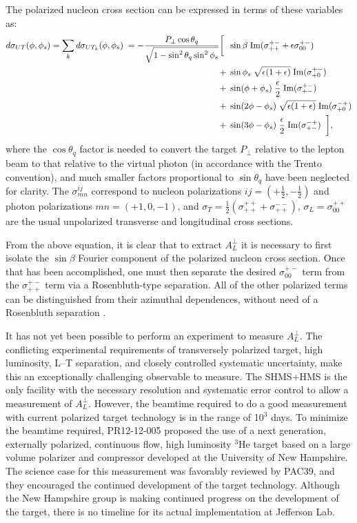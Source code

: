The polarized nucleon cross section can be expressed \cite{Di05,hermes-thesis} 
in terms of these variables as:
\begin{equation}
\begin{split}\label{eqn:sigtarg}
d\sigma_{UT}(\phi,\phi_s) =  \sum_k d\sigma_{UT_k}(\phi,\phi_s) \;
= -\frac{P_\perp \cos\theta_q}{\sqrt{1-\sin^2\theta_q \sin^2\phi_s}} \biggl[\; 
  &\; \sin\beta \; \rm{Im}(\sigma^{+-}_{++} + \epsilon\sigma^{+-}_{00})\\
 +&\; \sin\phi_s \; \sqrt{\epsilon(1+\epsilon)}\; \rm{Im}(\sigma^{+-}_{+0})\\
 +&\; \sin(\phi+\phi_s) \; \frac{\epsilon}{2} \; \rm{Im}(\sigma^{+-}_{+-})\\
 +&\; \sin(2\phi-\phi_s) \; \sqrt{\epsilon(1+\epsilon)} \; \rm{Im}(\sigma^{-+}_{+0}) \\
 +&\; \sin(3\phi-\phi_s) \; \frac{\epsilon}{2} \; \rm{Im}(\sigma^{-+}_{+-})\;\; \biggr] ,
\end{split}
\end{equation}
where the $\cos\theta_q$ factor is needed to convert the target $P_\perp$
relative to the lepton beam to that relative to the virtual photon
(in accordance with the Trento convention), and much smaller factors
proportional to $\sin\theta_q$ have been neglected for clarity.  
The $\sigma^{ij}_{mn}$ correspond to nucleon polarizations
$ij=(+\frac{1}{2},-\frac{1}{2})$ and photon polarizations $mn=(+1,0,-1)$, and
$\sigma_T=\frac{1}{2}(\sigma^{++}_{++}+\sigma^{--}_{++})$,
$\sigma_L=\sigma^{++}_{00}$ are the usual unpolarized transverse and
longitudinal cross sections.

From the above equation, it is clear that to extract $A_L^{\perp}$
it is necessary to first isolate the 
$\sin \beta$ Fourier component of the polarized nucleon cross section.
Once that has been accomplished, one must then separate the desired
$\sigma^{+-}_{00}$ term 
from the $\sigma^{+-}_{++}$ term via a Rosenbluth-type separation.  All of the
other polarized terms can be distinguished from their azimuthal dependences,
without need of a Rosenbluth separation \cite{Di05}.

It has not yet been possible to perform an experiment to measure $A_L^{\perp}$.
The conflicting experimental requirements of transversely polarized target,
high luminosity, L--T separation, and closely controlled systematic
uncertainty, make this an exceptionally challenging observable to measure.  The
SHMS+HMS is the only facility with the necessary resolution and systematic
error control to allow a measurement of $A_L^{\perp}$.  However, the beamtime
required to do a good measurement with current polarized target technology is
in the range of 10$^3$ days.  To minimize the beamtime required, PR12-12-005
\cite{atpi39}
proposed the use of a next generation, externally polarized, continuous flow,
high luminosity $^3$He target based on a large volume polarizer and compressor
developed at the University of New Hampshire.  The science case
for this measurement was favorably reviewed by PAC39, and they encouraged the
continued development of the target technology.  Although the New Hampshire
group is making continued progress on the development of the target, there is
no timeline for its actual implementation at Jefferson Lab.

